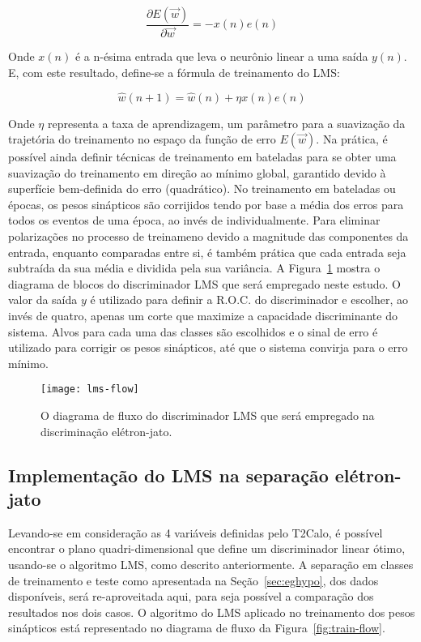 \begin{equation}
\frac{\partial E(\overrightarrow{w})}{\partial \overrightarrow{w}} =
-x(n)e(n) 
\end{equation}

Onde $x(n)$ é a n-ésima entrada que leva o neurônio linear a uma saída
$y(n)$. E, com este resultado, define-se a fórmula de treinamento do LMS:

\begin{equation}
\hat{w}(n+1) = \hat{w}(n) + \eta x(n)e(n)
\label{eq:lms}
\end{equation}

Onde $\eta$ representa a taxa de aprendizagem, um parâmetro para a suavização
da trajetória do treinamento no espaço da função de erro
$E(\overrightarrow{w})$. Na prática, é possível ainda definir técnicas de
treinamento em bateladas para se obter uma suavização do treinamento em
direção ao mínimo global, garantido devido à superfície bem-definida do erro
(quadrático). No treinamento em bateladas ou épocas, os pesos sinápticos são
corrijidos tendo por base a média dos erros para todos os eventos de uma
época, ao invés de individualmente. Para eliminar polarizações no processo de
treinameno devido a magnitude das componentes da entrada, enquanto comparadas
entre si, é também prática que cada entrada seja subtraída da sua média e
dividida pela sua variância. A Figura~\ref{fig:lms-flow} mostra o diagrama de
blocos do discriminador LMS que será empregado neste estudo. O valor da saída
$y$ é utilizado para definir a R.O.C. do discriminador e escolher, ao invés de
quatro, apenas um corte que maximize a capacidade discriminante do
sistema. Alvos para cada uma das classes são escolhidos e o sinal de erro é
utilizado para corrigir os pesos sinápticos, até que o sistema convirja para o
erro mínimo.

\begin{figure}
\begin{center}
\texttt{[image: lms-flow]}
\end{center}
\caption{O diagrama de fluxo do discriminador LMS que será empregado na
discriminação elétron-jato.}
\label{fig:lms-flow}
\end{figure}

\subsection{Implementação do LMS na separação e\-lé\-tron-jato}

Levando-se em consideração as 4 variáveis definidas pelo T2Calo, é possível
encontrar o plano quadri-dimensional que define um discriminador linear ótimo,
usando-se o algoritmo LMS, como descrito anteriormente. A separação em classes
de treinamento e teste como apresentada na Seção~\ref{sec:eghypo}, dos dados
disponíveis, será re-aproveitada aqui, para seja possível a comparação dos
resultados nos dois casos. O algoritmo do LMS aplicado no treinamento dos
pesos sinápticos está representado no diagrama de fluxo da
Figura~\ref{fig:train-flow}.

